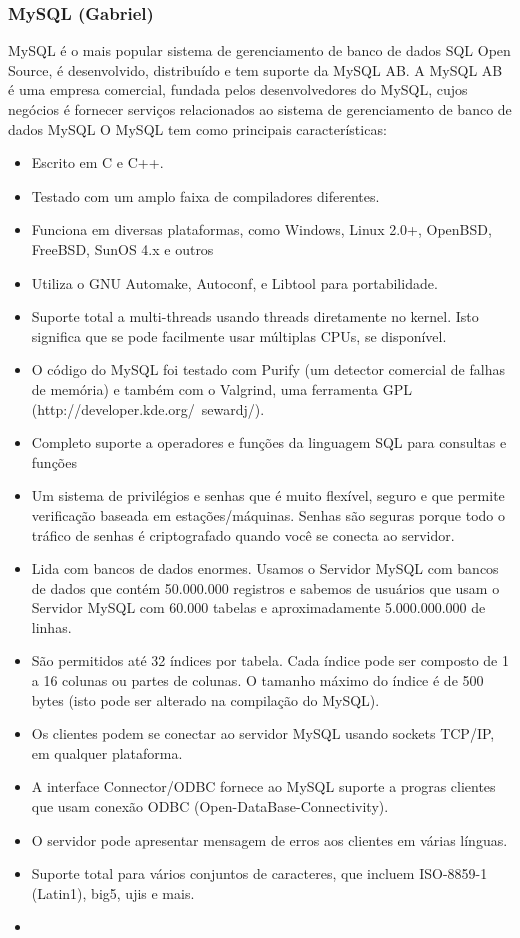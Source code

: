 \documentclass[conference]{IEEEtran}
\begin{document}
    \subsubsection{MySQL (Gabriel)}
	MySQL é o mais popular sistema de gerenciamento de banco de dados SQL Open Source, é desenvolvido, distribuído e tem suporte da MySQL AB. A MySQL AB é uma empresa comercial, fundada pelos desenvolvedores do MySQL, cujos negócios é fornecer serviços relacionados ao sistema de gerenciamento de banco de dados MySQL
	O MySQL tem como principais características:
\begin{itemize}
\item Escrito em C e C++.
\item Testado com um amplo faixa de compiladores diferentes.
\item Funciona em diversas plataformas, como Windows, Linux 2.0+, OpenBSD, FreeBSD, SunOS 4.x e outros
\item Utiliza o GNU Automake, Autoconf, e Libtool para portabilidade.
\item Suporte total a multi-threads usando threads diretamente no kernel. Isto significa que se pode facilmente usar múltiplas CPUs, se disponível.
\item O código do MySQL foi testado com Purify (um detector comercial de falhas de memória) e também com o Valgrind, uma ferramenta GPL (http://developer.kde.org/~sewardj/).
\item Completo suporte a operadores e funções da linguagem SQL para consultas e funções
\item Um sistema de privilégios e senhas que é muito flexível, seguro e que permite verificação baseada em estações/máquinas. Senhas são seguras porque todo o tráfico de senhas é criptografado quando você se conecta ao servidor.
\item Lida com bancos de dados enormes. Usamos o Servidor MySQL com bancos de dados que contém 50.000.000 registros e sabemos de usuários que usam o Servidor MySQL com 60.000 tabelas e aproximadamente 5.000.000.000 de linhas.
\item São permitidos até 32 índices por tabela. Cada índice pode ser composto de 1 a 16 colunas ou partes de colunas. O tamanho máximo do índice é de 500 bytes (isto pode ser alterado na compilação do MySQL). 
\item Os clientes podem se conectar ao servidor MySQL usando sockets TCP/IP, em qualquer plataforma.
\item A interface Connector/ODBC fornece ao MySQL suporte a progras clientes que usam conexão ODBC (Open-DataBase-Connectivity). 
\item O servidor pode apresentar mensagem de erros aos clientes em várias línguas. 
\item Suporte total para vários conjuntos de caracteres, que incluem ISO-8859-1 (Latin1), big5, ujis e mais.
\item
\end{itemize}
\end{document}
